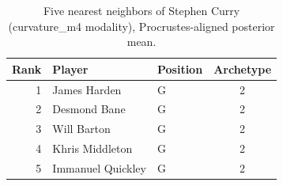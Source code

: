 \begin{table}[htbp]
  \centering\small
  \begin{tabular}{rllc}
    \toprule
    Rank & Player & Position & Archetype \\
    \midrule
    1 & James Harden & G & 2 \\
    2 & Desmond Bane & G & 2 \\
    3 & Will Barton & G & 2 \\
    4 & Khris Middleton & G & 2 \\
    5 & Immanuel Quickley & G & 2 \\
    \bottomrule
  \end{tabular}
  \caption{Five nearest neighbors of Stephen Curry (curvature_m4 modality), Procrustes-aligned posterior mean.}
  \label{tab:Stephen_Curry_neighbors_curvature_m4}
\end{table}

